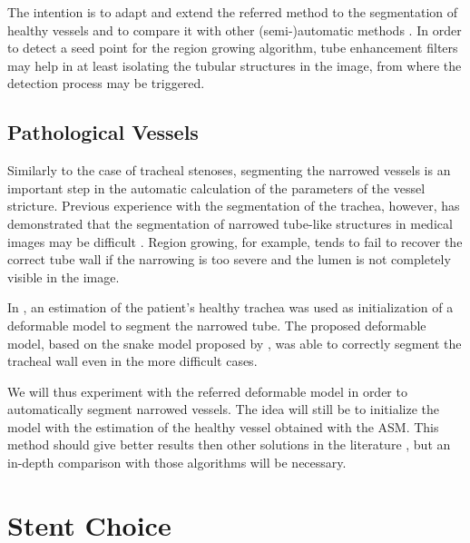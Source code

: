 
The intention is to adapt and extend the referred method to the segmentation of healthy vessels and to compare it with other (semi-)automatic methods \citep{Zhou20121,CARR-07,FLOR-07b,Florez2,Scherl200721,Antiga,Bemmel}. In order to detect a seed point for the region growing algorithm, tube enhancement filters \citep{ORLO-09} may help in at least isolating the tubular structures in the image, from where the detection process may be triggered. 

\subsection{Pathological Vessels}
\label{sec:pathologicalvessels}

\challenge
Similarly to the case of tracheal stenoses, segmenting the narrowed vessels is an important step in the automatic calculation of the parameters of the vessel stricture. Previous experience with the segmentation of the trachea, however, has demonstrated that the segmentation of narrowed tube-like structures in medical images may be difficult \citep{Triglia,Pinho:Trachea7}. Region growing, for example, tends to fail to recover the correct tube wall if the narrowing is too severe and the lumen is not completely visible in the image. 

\approach

In \citep{Pinho:Trachea4}, an estimation of the patient's healthy trachea was used as initialization of a deformable model to segment the narrowed tube. The proposed deformable model, based on the snake model proposed by \citep{Kass}, was able to correctly segment the tracheal wall even in the more difficult cases. 

We will thus experiment with the referred deformable model in order to automatically segment narrowed vessels. The idea will still be to initialize the model with the estimation of the healthy vessel obtained with the ASM. This method should give better results then other solutions in the literature \citep{CARR-07,Florez2,Antiga,Bemmel}, but an in-depth comparison with those algorithms will be necessary.

\section{Stent Choice}

